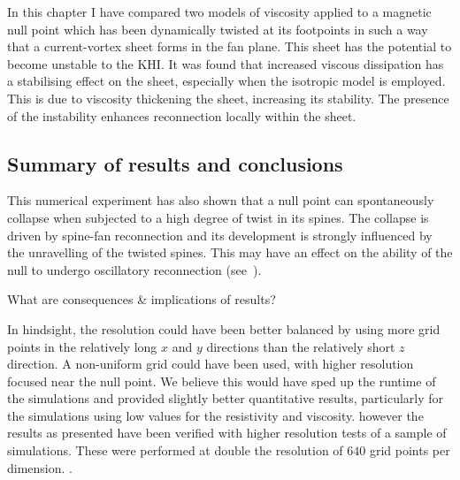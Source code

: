 In this chapter I have compared two models of viscosity applied to a magnetic null point which has been dynamically twisted at its footpoints in such a way that a current-vortex sheet forms in the fan plane. This sheet has the potential to become unstable to the KHI. It was found that increased viscous dissipation has a stabilising effect on the sheet, especially when the isotropic model is employed. This is due to viscosity thickening the sheet, increasing its stability. The presence of the instability enhances reconnection locally within the sheet.

\subsection{Summary of results and conclusions}


This numerical experiment has also shown that a null point can spontaneously collapse when subjected to a high degree of twist in its spines. The collapse is driven by spine-fan reconnection and its development is strongly influenced by the unravelling of the twisted spines. This may have an effect on the ability of the null to undergo oscillatory reconnection (see~\cite{thurgoodThreedimensionalOscillatoryMagnetic2017}).

What are consequences \& implications of results?

In hindsight, the resolution could have been better balanced by using more grid points in the relatively long $x$ and $y$ directions than the relatively short $z$ direction. A non-uniform grid could have been used, with higher resolution focused near the null point. We believe this would have sped up the runtime of the simulations and provided slightly better quantitative results, particularly for the simulations using low values for the resistivity and viscosity. however the results as presented have been verified with higher resolution tests of a sample of simulations. These were performed at double the resolution of $640$ grid points per dimension. .
